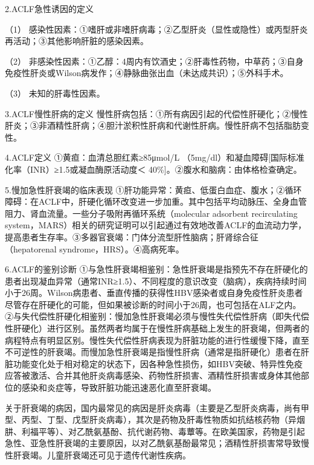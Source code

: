 2.ACLF急性诱因的定义

（1）
感染性因素：①嗜肝或非嗜肝病毒；②乙型肝炎（显性或隐性）或丙型肝炎再活动；③其他影响肝脏的感染因素。

（2）
非感染性因素：①乙醇：4周内有饮酒史；②肝毒性药物，中草药；③自身免疫性肝炎或Wilson病发作；④静脉曲张出血（未达成共识）；⑤外科手术。

（3） 未知的肝毒性因素。

3.ACLF慢性肝病的定义
慢性肝病包括：①所有病因引起的代偿性肝硬化；②慢性肝炎；③非酒精性肝病；④胆汁淤积性肝病和代谢性肝病。慢性肝病不包括脂肪变性。

4.ACLF定义 ①黄疸：血清总胆红素≥85μmol/L
（5mg/dl）和凝血障碍{[}国际标准化率（INR）≥1.5或凝血酶原活动度＜
40\%{]}。②腹水和脑病：由体格检查确定。

5.慢加急性肝衰竭的临床表现
①肝功能异常：黄疸、低蛋白血症、腹水；②循环障碍：在ACLF中，肝硬化循环改变进一步加重。其中包括平均动脉压、全身血管阻力、肾血流量。一些分子吸附再循环系统（molecular
adsorbent recirculating
system，MARS）相关的研究证明可以引起通过有效地改善ACLF的血流动力学，提高患者生存率。③多器官衰竭：门体分流型肝性脑病；肝肾综合征（hepatorenal
syndrome，HRS）。④高病死率。

6.ACLF的鉴别诊断
①与急性肝衰竭相鉴别：急性肝衰竭是指预先不存在肝硬化的患者出现凝血异常（通常INR≥1.5）、不同程度的意识改变（脑病），疾病持续时间小于26周。Wilson病患者、垂直传播的获得性HBV感染者或自身免疫性肝炎患者尽管存在肝硬化的可能，但如果被诊断的时间小于26周，也可包括在ALF之内。②与失代偿性肝硬化相鉴别：慢加急性肝衰竭必须与慢性失代偿性肝病（即失代偿性肝硬化）进行区别。虽然两者均属于在慢性肝病基础上发生的肝衰竭，但两者的病程特点有明显区别。慢性失代偿性肝病表现为肝脏功能的进行性缓慢下降，直至不可逆性的肝衰竭。而慢加急性肝衰竭是指慢性肝病（通常是指肝硬化）患者在肝脏功能变化处于相对稳定的状态下，因各种急性损伤，如HBV突破、特异性免疫应答被激活、合并其他肝炎病毒感染、药物性肝损害、酒精性肝损害或身体其他部位的感染和炎症等，导致肝脏功能迅速恶化直至肝衰竭。

关于肝衰竭的病因，国内最常见的病因是肝炎病毒（主要是乙型肝炎病毒，尚有甲型、丙型、丁型、戊型肝炎病毒），其次是药物及肝毒性物质如抗结核药物（异烟肼、利福平等）、对乙酰氨基酚、抗代谢药物、毒蕈等。在欧美国家，药物是引起急性、亚急性肝衰竭的主要原因，以对乙酰氨基酚最常见；酒精性肝损害常导致慢性肝衰竭。儿童肝衰竭还可见于遗传代谢性疾病。

